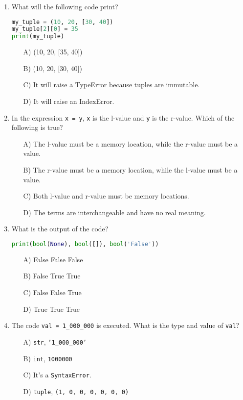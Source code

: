 \documentclass[9pt]{article}
\begin{document}
\begin{multicols}{2}
\begin{enumerate}
\item What will the following code print?
\begin{lstlisting}[language=Python]
my_tuple = (10, 20, [30, 40])
my_tuple[2][0] = 35
print(my_tuple)
\end{lstlisting}
\begin{enumerate}
\item[A)] (10, 20, [35, 40])
\item[B)] (10, 20, [30, 40])
\item[C)] It will raise a TypeError because tuples are immutable.
\item[D)] It will raise an IndexError.
\end{enumerate}

\item In the expression \texttt{x = y}, \texttt{x} is the l-value and \texttt{y} is the r-value. Which of the following is true?
\begin{enumerate}
    \item[A)] The l-value must be a memory location, while the r-value must be a value.
    \item[B)] The r-value must be a memory location, while the l-value must be a value.
    \item[C)] Both l-value and r-value must be memory locations.
    \item[D)] The terms are interchangeable and have no real meaning.
\end{enumerate}

\item What is the output of the code?
\begin{lstlisting}[language=Python]
print(bool(None), bool([]), bool('False'))
\end{lstlisting}
\begin{enumerate}
\item[A)] False False False
\item[B)] False True True
\item[C)] False False True
\item[D)] True True True
\end{enumerate}

\item The code \texttt{val = 1\_000\_000} is executed. What is the type and value of \texttt{val}?
\begin{enumerate}
    \item[A)] \texttt{str}, \texttt{'1\_000\_000'}
    \item[B)] \texttt{int}, \texttt{1000000}
    \item[C)] It's a \texttt{SyntaxError}.
    \item[D)] \texttt{tuple}, \texttt{(1, 0, 0, 0, 0, 0, 0)}
\end{enumerate}


\end{enumerate}
\end{multicols}
\end{document}
